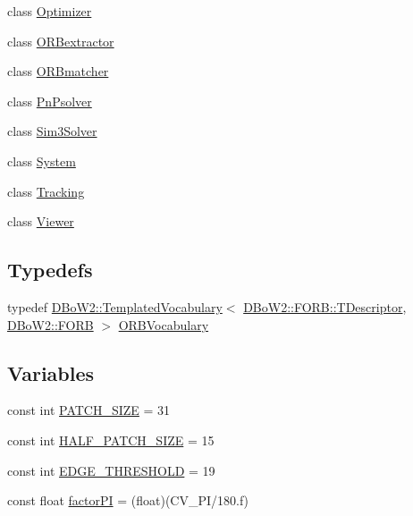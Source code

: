 \begin{DoxyCompactItemize}
class \mbox{\hyperlink{class_o_r_b___s_l_a_m2_1_1_optimizer}{Optimizer}}
\item 
class \mbox{\hyperlink{class_o_r_b___s_l_a_m2_1_1_o_r_bextractor}{O\+R\+Bextractor}}
\item 
class \mbox{\hyperlink{class_o_r_b___s_l_a_m2_1_1_o_r_bmatcher}{O\+R\+Bmatcher}}
\item 
class \mbox{\hyperlink{class_o_r_b___s_l_a_m2_1_1_pn_psolver}{Pn\+Psolver}}
\item 
class \mbox{\hyperlink{class_o_r_b___s_l_a_m2_1_1_sim3_solver}{Sim3\+Solver}}
\item 
class \mbox{\hyperlink{class_o_r_b___s_l_a_m2_1_1_system}{System}}
\item 
class \mbox{\hyperlink{class_o_r_b___s_l_a_m2_1_1_tracking}{Tracking}}
\item 
class \mbox{\hyperlink{class_o_r_b___s_l_a_m2_1_1_viewer}{Viewer}}
\end{DoxyCompactItemize}
\subsection*{Typedefs}
\begin{DoxyCompactItemize}
\item 
typedef \mbox{\hyperlink{class_d_bo_w2_1_1_templated_vocabulary}{D\+Bo\+W2\+::\+Templated\+Vocabulary}}$<$ \mbox{\hyperlink{class_d_bo_w2_1_1_f_o_r_b_aef9b966d0293836fab9f55f1799ce0ed}{D\+Bo\+W2\+::\+F\+O\+R\+B\+::\+T\+Descriptor}}, \mbox{\hyperlink{class_d_bo_w2_1_1_f_o_r_b}{D\+Bo\+W2\+::\+F\+O\+RB}} $>$ \mbox{\hyperlink{namespace_o_r_b___s_l_a_m2_a2fafba714858cab1bb18d438e2e83c5d}{O\+R\+B\+Vocabulary}}
\end{DoxyCompactItemize}
\subsection*{Variables}
\begin{DoxyCompactItemize}
\item 
const int \mbox{\hyperlink{namespace_o_r_b___s_l_a_m2_a557e5c298c5f7164667f083494c2197a}{P\+A\+T\+C\+H\+\_\+\+S\+I\+ZE}} = 31
\item 
const int \mbox{\hyperlink{namespace_o_r_b___s_l_a_m2_aa09849ae679bf2392b097abd710d8d7f}{H\+A\+L\+F\+\_\+\+P\+A\+T\+C\+H\+\_\+\+S\+I\+ZE}} = 15
\item 
const int \mbox{\hyperlink{namespace_o_r_b___s_l_a_m2_aec00f1ad4dea35755e3af4404282cd3b}{E\+D\+G\+E\+\_\+\+T\+H\+R\+E\+S\+H\+O\+LD}} = 19
\item 
const float \mbox{\hyperlink{namespace_o_r_b___s_l_a_m2_a8015b470ffeb885a0c90837a03b3210f}{factor\+PI}} = (float)(C\+V\+\_\+\+PI/180.f)
\end{DoxyCompactItemize}


